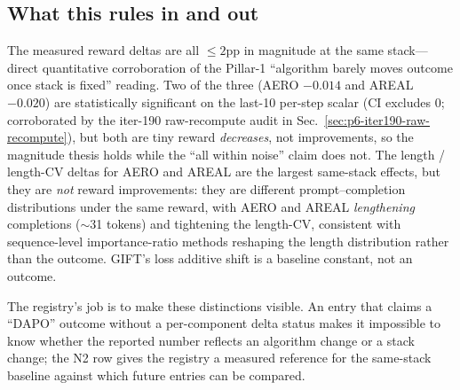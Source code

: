\subsection{What this rules in and out}
The measured reward deltas are all $\leq 2$pp in magnitude at the same
stack---direct quantitative corroboration of the Pillar-1 ``algorithm
barely moves outcome once stack is fixed'' reading. Two of the three
(AERO $-0.014$ and AREAL $-0.020$) are statistically significant on the
last-10 per-step scalar (CI excludes $0$; corroborated by the iter-190
raw-recompute audit in Sec.~\ref{sec:p6-iter190-raw-recompute}), but both are tiny
reward \emph{decreases}, not improvements, so the magnitude thesis holds
while the ``all within noise'' claim does not. The length / length-CV
deltas for AERO and AREAL are the largest same-stack effects, but they
are \emph{not} reward improvements: they are different
prompt--completion distributions under the same reward, with AERO and
AREAL \emph{lengthening} completions ($\sim$31 tokens) and tightening
the length-CV, consistent with sequence-level importance-ratio methods
reshaping the length distribution rather than the outcome. GIFT's loss
additive shift is a baseline constant, not an outcome.

The registry's job is to make these distinctions visible. An entry that
claims a ``DAPO'' outcome without a per-component delta status makes it
impossible to know whether the reported number reflects an algorithm
change or a stack change; the N2 row gives the registry a measured
reference for the same-stack baseline against which future entries can
be compared.